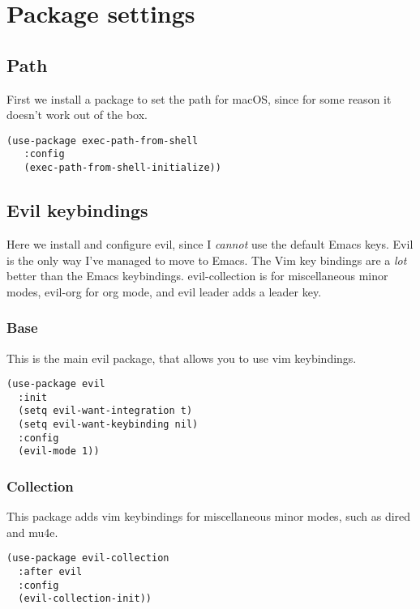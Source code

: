 \documentclass[11pt]{article}
\begin{document}
\section*{Package settings}
\label{sec:org2673298}

\subsection*{Path}
\label{sec:org0ae0fbf}

First we install a package to set the path for macOS, since for some reason it doesn't work out of the box.

\begin{verbatim}
(use-package exec-path-from-shell
   :config
   (exec-path-from-shell-initialize))
\end{verbatim}

\subsection*{Evil keybindings}
\label{sec:orgb5321d5}

Here we install and configure evil, since I \emph{cannot} use the default Emacs keys. Evil is the only way I've managed to move to Emacs. The Vim key bindings are a \emph{lot} better than the Emacs keybindings. evil-collection is for miscellaneous minor modes, evil-org for org mode, and evil leader adds a leader key.

\subsubsection*{Base}
\label{sec:org14c8151}

This is the main evil package, that allows you to use vim keybindings.

\begin{verbatim}
(use-package evil
  :init
  (setq evil-want-integration t)
  (setq evil-want-keybinding nil)
  :config
  (evil-mode 1))
\end{verbatim}

\subsubsection*{Collection}
\label{sec:orgc8b365f}

This package adds vim keybindings for miscellaneous minor modes, such as dired and mu4e.

\begin{verbatim}
(use-package evil-collection
  :after evil
  :config
  (evil-collection-init))
\end{verbatim}
\end{document}
